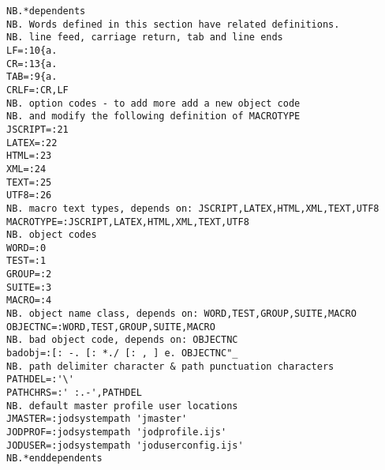 \begin{lstlisting}[frame=single,framerule=0pt,basicstyle=\ttfamily\footnotesize]
NB.*dependents 
NB. Words defined in this section have related definitions.
NB. line feed, carriage return, tab and line ends
LF=:10{a.
CR=:13{a.
TAB=:9{a.
CRLF=:CR,LF
NB. option codes - to add more add a new object code
NB. and modify the following definition of MACROTYPE
JSCRIPT=:21
LATEX=:22
HTML=:23
XML=:24
TEXT=:25
UTF8=:26
NB. macro text types, depends on: JSCRIPT,LATEX,HTML,XML,TEXT,UTF8
MACROTYPE=:JSCRIPT,LATEX,HTML,XML,TEXT,UTF8
NB. object codes
WORD=:0
TEST=:1
GROUP=:2
SUITE=:3
MACRO=:4
NB. object name class, depends on: WORD,TEST,GROUP,SUITE,MACRO
OBJECTNC=:WORD,TEST,GROUP,SUITE,MACRO
NB. bad object code, depends on: OBJECTNC
badobj=:[: -. [: *./ [: , ] e. OBJECTNC"_
NB. path delimiter character & path punctuation characters
PATHDEL=:'\'
PATHCHRS=:' :.-',PATHDEL
NB. default master profile user locations
JMASTER=:jodsystempath 'jmaster'
JODPROF=:jodsystempath 'jodprofile.ijs'
JODUSER=:jodsystempath 'joduserconfig.ijs'
NB.*enddependents
\end{lstlisting}

